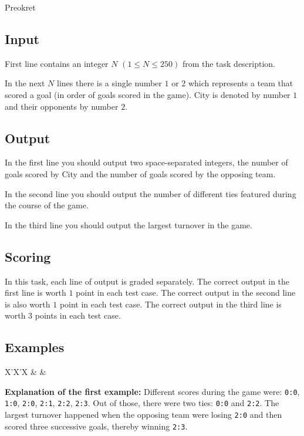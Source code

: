 \begin{statement}[
  problempoints=50,
  timelimit=1 second,
  memorylimit=512 MiB,
]{Preokret}
\subsection*{Input}
First line contains an integer $N$ $(1 \le N \le 250)$ from the task description.

In the next $N$ lines there is a single number $1$ or $2$ which represents a
team that scored a goal (in order of goals scored in the game). City is
denoted by number $1$ and their opponents by number $2$.

\subsection*{Output}
In the first line you should output two space-separated integers, the number
of goals scored by City and the number of goals scored by the opposing team.

In the second line you should output the number of different ties featured
during the course of the game.

In the third line you should output the largest turnover in the game.

\subsection*{Scoring}
In this task, each line of output is graded separately. The correct output
in the first line is worth $1$ point in each test case. The correct output
in the second line is also worth $1$ point in each test case. The correct
output in the third line is worth $3$ points in each test case.

\subsection*{Examples}
\begin{tabularx}{\textwidth}{X'X'X}
 &
 &
\end{tabularx}

\textbf{Explanation of the first example:}
Different scores during the game were: \texttt{0:0}, \texttt{1:0},
\texttt{2:0}, \texttt{2:1}, \texttt{2:2}, \texttt{2:3}. Out of those, there
were two ties: \texttt{0:0} and \texttt{2:2}. The largest turnover happened
when the opposing team were losing \texttt{2:0} and then scored three successive
goals, thereby winning \texttt{2:3}.


\end{statement}
